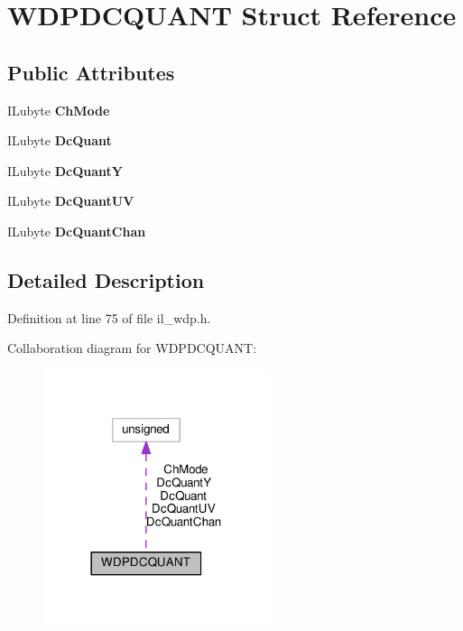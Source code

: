\hypertarget{structWDPDCQUANT}{}\section{W\+D\+P\+D\+C\+Q\+U\+A\+NT Struct Reference}
\label{structWDPDCQUANT}
\subsection*{Public Attributes}
\begin{DoxyCompactItemize}
\item 
\mbox{\label{structWDPDCQUANT_aa810e4255e0ad5e28f96a5fb2d9d416c}} 
I\+Lubyte {\bfseries Ch\+Mode}
\item 
\mbox{\label{structWDPDCQUANT_a77b4762219d96acaff87211f0c60a07e}} 
I\+Lubyte {\bfseries Dc\+Quant}
\item 
\mbox{\label{structWDPDCQUANT_ac34b691a0c1bce9f7a3809c6d4cd6d7e}} 
I\+Lubyte {\bfseries Dc\+QuantY}
\item 
\mbox{\label{structWDPDCQUANT_a4d589c6fc10c03e3dcdbd29aab6c0d0e}} 
I\+Lubyte {\bfseries Dc\+Quant\+UV}
\item 
\mbox{\label{structWDPDCQUANT_ae4ebb16a7d67985c0e9e6ed4fb946f6f}} 
I\+Lubyte {\bfseries Dc\+Quant\+Chan}
\end{DoxyCompactItemize}


\subsection{Detailed Description}


Definition at line 75 of file il\+\_\+wdp.\+h.



Collaboration diagram for W\+D\+P\+D\+C\+Q\+U\+A\+NT\+:
\nopagebreak
\begin{figure}[H]
\begin{center}
\leavevmode
\includegraphics[width=189pt]{d1/de4/structWDPDCQUANT__coll__graph}
\end{center}
\end{figure}


